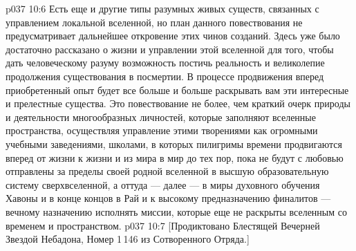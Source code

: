 \vs p037 10:6 Есть еще и другие типы разумных живых существ, связанных с управлением локальной вселенной, но план данного повествования не предусматривает дальнейшее откровение этих чинов созданий. Здесь уже было достаточно рассказано о жизни и управлении этой вселенной для того, чтобы дать человеческому разуму возможность постичь реальность и великолепие продолжения существования в посмертии. В процессе продвижения вперед приобретенный опыт будет все больше и больше раскрывать вам эти интересные и прелестные существа. Это повествование не более, чем краткий очерк природы и деятельности многообразных личностей, которые заполняют вселенные пространства, осуществляя управление этими творениями как огромными учебными заведениями, школами, в которых пилигримы времени продвигаются вперед от жизни к жизни и из мира в мир до тех пор, пока не будут с любовью отправлены за пределы своей родной вселенной в высшую образовательную систему сверхвселенной, а оттуда --- далее --- в миры духовного обучения Хавоны и в конце концов в Рай и к высокому предназначению финалитов --- вечному назначению исполнять миссии, которые еще не раскрыты вселенным со временем и пространством.
\vsetoff
\vs p037 10:7 [Продиктовано Блестящей Вечерней Звездой Небадона, Номер 1\,146 из Сотворенного Отряда.]
